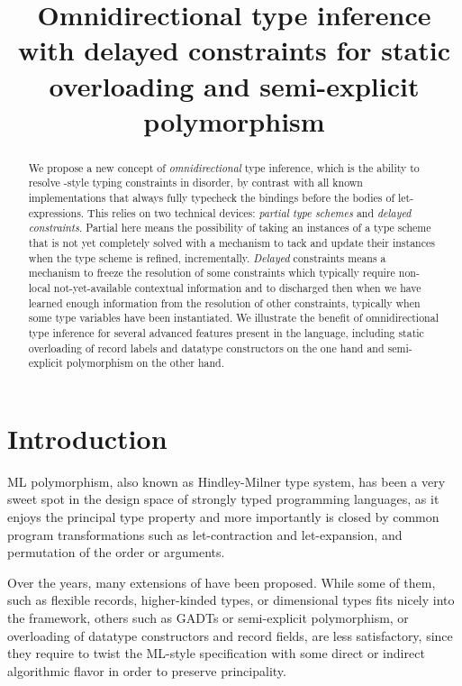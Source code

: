 \documentclass[acmsmall,screen,nonacm]{acmart}
\title{Omnidirectional type inference with delayed constraints
   for static overloading and semi-explicit polymorphism}
\begin{document}
\begin{abstract}
We propose a new concept of \emph{omnidirectional} type inference, which is
the ability to resolve \ML-style typing constraints in disorder, by
contrast with all known implementations that always fully typecheck the
bindings before the bodies of let-expressions.
%
This relies on two technical devices: \emph{partial type schemes}
and \emph{delayed constraints}. Partial here means  the
possibility of taking an instances of a type scheme that is not yet
completely solved with a mechanism to tack and update their instances when
the type scheme is refined, incrementally.
\emph{Delayed} constraints means a mechanism to freeze the resolution of
some constraints which typically require non-local not-yet-available
contextual information and to discharged then when we have learned enough
information from the resolution of other constraints, typically when some type
variables have been instantiated.
%
We illustrate the benefit of omnidirectional type inference for several
advanced features present in the \OCaml language, including static
overloading of record labels and datatype constructors on the one hand and
semi-explicit polymorphism on the other hand.
\end{abstract}

\maketitle


\section{Introduction}

ML polymorphism, also known as Hindley-Milner type system, has been a very
sweet spot in the design space of strongly typed programming languages, as
it enjoys the principal type property and more importantly is closed by
common program transformations such as let-contraction and let-expansion,
and permutation of the order or arguments.

Over the years, many extensions of \ML have been proposed.  While some of
them, such as flexible records, higher-kinded types, or dimensional types
fits nicely into the \ML framework, others such as GADTs or semi-explicit
polymorphism, or overloading of datatype constructors and record fields, are
less satisfactory, since they require to twist the ML-style specification
with some direct or indirect algorithmic flavor in order to preserve
principality.
\end{document}
